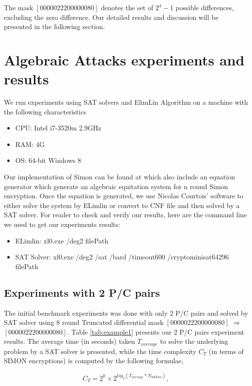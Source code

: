 The mask $[00000222 00000080]$ denotes the set of $2^4-1$ possible differences,
excluding the zero difference.
Our detailed results and discussion will be presented in the following section.

\section{Algebraic Attacks experiments and results}
We run experiments using SAT solvers and ElimLin Algorithm on a machine with the
following characteristics

\begin{itemize}
	\item CPU: Intel i7-3520m 2.9GHz
	\item RAM: 4G
	\item OS: 64-bit Windows 8
\end{itemize}

Our implementation of Simon can be found at \cite{simonref} which also include an equation generator which generate an algebraic equitation system for n round Simon encryption. Once the equation is generated, we use Nicolas Courtois' software \cite{EquationSolving} to either solve the system by ELimlin or convert to CNF file and then solved by a SAT solver. For reader to check and verify our results, here are the command line we used to get our experiments results:

\begin{itemize}
	\item ELimlin: xl0.exe /deg2 filePath
	\item SAT Solver: xl0.exe /deg2 /sat /bard /timeout600 /cryptominisat64296 filePath
\end{itemize}

\subsection{Experiments with 2 P/C pairs}
The initial benchmark experiments was done with only 2 P/C pairs and solved by SAT solver using 8 round Truncated differential mask $[00000222 00000080]$ $\Rightarrow$ $[00000222 00000080]$. Table \ref{tab:example1} presents our 2 P/C pairs experiment results. The average time (in seconds) taken $T_{average}$
to solve the underlying problem
by a SAT solver is presented, while the time complexity $C_T$
(in terms of SIMON encryptions) is
computed by the following formulae,

\begin{equation}
C_T=2^{k}\times2^{log_2(T_{average}*N_{8REnc})},
\end{equation}

